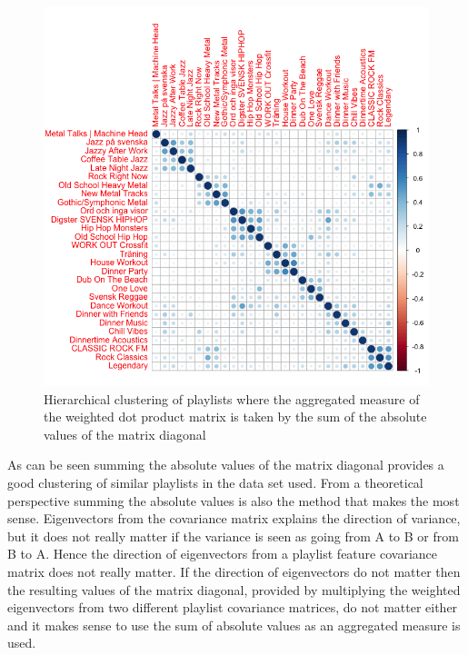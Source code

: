 \documentclass[a4paper,11pt]{kth-mag}
\begin{document}
\begin{figure}
\includegraphics[scale=0.5]{images/sumAbs.png}
\caption{Hierarchical clustering of playlists where the aggregated measure of the weighted dot product matrix is taken by the sum of the absolute values of the matrix diagonal}
\end{figure}


As can be seen summing the absolute values of the matrix diagonal provides a good clustering of similar playlists in the data set used. From a theoretical perspective summing the absolute values is also the method that makes the most sense. Eigenvectors from the covariance matrix explains the direction of variance, but it does not really matter if the variance is seen as going from A to B or from B to A. Hence the direction of eigenvectors from a playlist feature covariance matrix does not really matter. If the direction of eigenvectors do not matter then the resulting values of the matrix diagonal, provided by multiplying the weighted eigenvectors from two different playlist covariance matrices, do not matter either and it makes sense to use the sum of absolute values as an aggregated measure is used.
\end{document}
